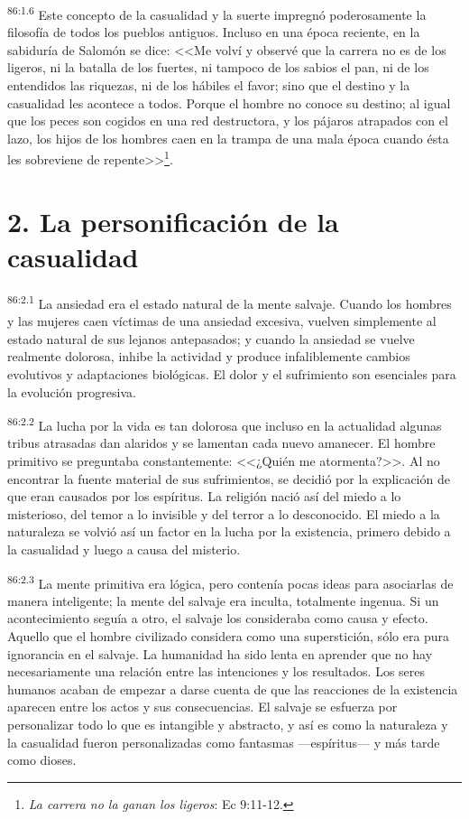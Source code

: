 \documentclass[twoside, 11pt]{book}
\begin{document}
\par
\textsuperscript{86:1.6} Este concepto de la casualidad y la suerte impregnó poderosamente la filosofía de todos los pueblos antiguos. Incluso en una época reciente, en la sabiduría de Salomón se dice: <<Me volví y observé que la carrera no es de los ligeros, ni la batalla de los fuertes, ni tampoco de los sabios el pan, ni de los entendidos las riquezas, ni de los hábiles el favor; sino que el destino y la casualidad les acontece a todos. Porque el hombre no conoce su destino; al igual que los peces son cogidos en una red destructora, y los pájaros atrapados con el lazo, los hijos de los hombres caen en la trampa de una mala época cuando ésta les sobreviene de repente>>\footnote{\textit{La carrera no la ganan los ligeros}: Ec 9:11-12.}.

\section*{2. La personificación de la casualidad}
\par
\textsuperscript{86:2.1} La ansiedad era el estado natural de la mente salvaje. Cuando los hombres y las mujeres caen víctimas de una ansiedad excesiva, vuelven simplemente al estado natural de sus lejanos antepasados; y cuando la ansiedad se vuelve realmente dolorosa, inhibe la actividad y produce infaliblemente cambios evolutivos y adaptaciones biológicas. El dolor y el sufrimiento son esenciales para la evolución progresiva.

\par
\textsuperscript{86:2.2} La lucha por la vida es tan dolorosa que incluso en la actualidad algunas tribus atrasadas dan alaridos y se lamentan cada nuevo amanecer. El hombre primitivo se preguntaba constantemente: <<¿Quién me atormenta?>>. Al no encontrar la fuente material de sus sufrimientos, se decidió por la explicación de que eran causados por los espíritus. La religión nació así del miedo a lo misterioso, del temor a lo invisible y del terror a lo desconocido. El miedo a la naturaleza se volvió así un factor en la lucha por la existencia, primero debido a la casualidad y luego a causa del misterio.

\par
\textsuperscript{86:2.3} La mente primitiva era lógica, pero contenía pocas ideas para asociarlas de manera inteligente; la mente del salvaje era inculta, totalmente ingenua. Si un acontecimiento seguía a otro, el salvaje los consideraba como causa y efecto. Aquello que el hombre civilizado considera como una superstición, sólo era pura ignorancia en el salvaje. La humanidad ha sido lenta en aprender que no hay necesariamente una relación entre las intenciones y los resultados. Los seres humanos acaban de empezar a darse cuenta de que las reacciones de la existencia aparecen entre los actos y sus consecuencias. El salvaje se esfuerza por personalizar todo lo que es intangible y abstracto, y así es como la naturaleza y la casualidad fueron personalizadas como fantasmas ---espíritus--- y más tarde como dioses.
\end{document}
